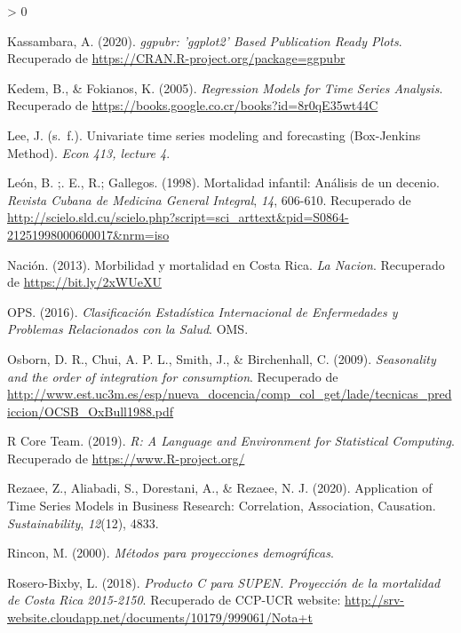 \documentclass[
]{article}
\newlength{\cslhangindent}
\newenvironment{CSLReferences}[2] %
 {%
  \setlength{\parindent}{0pt}
  \ifodd #1 \everypar{\setlength{\hangindent}{\cslhangindent}}\ignorespaces\fi
  \ifnum #2 > 0
  \setlength{\parskip}{#2\baselineskip}
  \fi
 }%
 {}
\begin{document}
\begin{CSLReferences}{1}{0}
\leavevmode\hypertarget{ref-ggpubr}{}%
Kassambara, A. (2020). \emph{ggpubr: 'ggplot2' Based Publication Ready
Plots}. Recuperado de \url{https://CRAN.R-project.org/package=ggpubr}

\leavevmode\hypertarget{ref-kedem}{}%
Kedem, B., \& Fokianos, K. (2005). \emph{Regression Models for Time
Series Analysis}. Recuperado de
\url{https://books.google.co.cr/books?id=8r0qE35wt44C}

\leavevmode\hypertarget{ref-Lee}{}%
Lee, J. (s.~f.). Univariate time series modeling and forecasting
(Box-Jenkins Method). \emph{Econ 413, lecture 4}.

\leavevmode\hypertarget{ref-leon}{}%
León, B. ;. E., R.; Gallegos. (1998). {Mortalidad infantil: Análisis de
un decenio}. \emph{{Revista Cubana de Medicina General Integral}},
\emph{14}, 606-610. Recuperado de
\url{http://scielo.sld.cu/scielo.php?script=sci_arttext\&pid=S0864-21251998000600017\&nrm=iso}

\leavevmode\hypertarget{ref-nacion}{}%
Nación. (2013). Morbilidad y mortalidad en Costa Rica. \emph{La Nacion}.
Recuperado de \url{https://bit.ly/2xWUeXU}

\leavevmode\hypertarget{ref-CIE10}{}%
OPS. (2016). \emph{Clasificación Estadística Internacional de
Enfermedades y Problemas Relacionados con la Salud}. OMS.

\leavevmode\hypertarget{ref-Osborn2009SEASONALITYAT}{}%
Osborn, D. R., Chui, A. P. L., Smith, J., \& Birchenhall, C. (2009).
\emph{Seasonality and the order of integration for consumption}.
Recuperado de
\url{http://www.est.uc3m.es/esp/nueva_docencia/comp_col_get/lade/tecnicas_prediccion/OCSB_OxBull1988.pdf}

\leavevmode\hypertarget{ref-parallel}{}%
R Core Team. (2019). \emph{R: A Language and Environment for Statistical
Computing}. Recuperado de \url{https://www.R-project.org/}

\leavevmode\hypertarget{ref-tsa_decision_making}{}%
Rezaee, Z., Aliabadi, S., Dorestani, A., \& Rezaee, N. J. (2020).
Application of Time Series Models in Business Research: Correlation,
Association, Causation. \emph{Sustainability}, \emph{12}(12), 4833.

\leavevmode\hypertarget{ref-Rincon}{}%
Rincon, M. (2000). \emph{Métodos para proyecciones demográficas}.

\leavevmode\hypertarget{ref-supenprodc}{}%
Rosero-Bixby, L. (2018). \emph{Producto C para SUPEN. Proyección de la
mortalidad de Costa Rica 2015-2150}. Recuperado de CCP-UCR website:
\url{http://srv-website.cloudapp.net/documents/10179/999061/Nota+t}


\end{CSLReferences}
\end{document}
